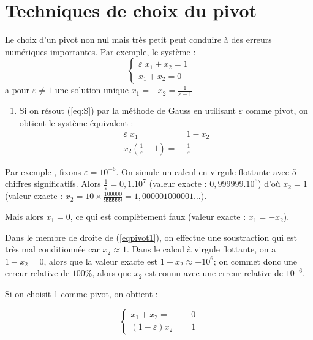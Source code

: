 \section{Techniques de choix du pivot}

Le choix d'un pivot non nul mais très petit peut conduire à des erreurs numériques importantes.
Par exemple, le système :
\begin{equation*}
    \left\lbrace
    \begin{array}{c}
        \varepsilon \; x_1 + x_2 = 1 \\
        x_1 + x_2 = 0 
    \end{array} \right.
\end{equation*}
a pour $\varepsilon \ne 1$ une solution unique $x_1 = -x_2 = \displaystyle\frac{1}{\varepsilon - 1}$

\begin{enumerate}[label=-]
    \item Si on résout (\ref{eq:S}) par la méthode de Gauss en utilisant $\varepsilon$ comme
        pivot, on obtient le système équivalent :
            \begin{align}
                \label{eqpivot1}
                \varepsilon \; x_1 = \; & 1 - x_2  \\
                x_2 (\frac{1}{\varepsilon} - 1) = \; & \frac{1}{\varepsilon} 
                \label{eqpivot2}
            \end{align}
\end{enumerate}

Par exemple , fixons $\varepsilon = 10^{-6}$. On simule un calcul
en virgule flottante avec 5 chiffres significatifs. Alors
$\frac{1}{\varepsilon} = 0,1.10^{7}$ (valeur exacte : $0,999999.10^6$)
d'où $x_2 = 1$ (valeur exacte : $x_2 = 10 \times \frac{100000}{999999} = 1,000001000001\dots$).

Mais alors $x_1 = 0$, ce qui est complètement faux (valeur exacte :
$x_1 = -x_2$).

Dans le membre de droite de (\ref{eqpivot1}), on effectue une 
soustraction qui est très mal conditionnée car $x_2 \approx 1$. Dans le calcul à
virgule flottante, on a $1 - x_2 = 0$, alors que la valeur exacte est 
$1 - x_2 \approx - 10^6$; on commet donc une erreur relative de $100 \%$,
alors que $x_2$ est connu avec une erreur relative de $10^{-6}$.

Si on choisit 1 comme pivot, on obtient :

\begin{equation*}
     \left \lbrace
     \begin{array}{ccc}
         x_1 + x_2  = & 0 \\[7pt]
         (1 - \varepsilon) x_2  = & 1
     \end{array}
     \right.
\end{equation*}

